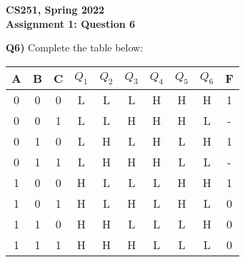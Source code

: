 \documentclass[12pt]{article}
\begin{document}
\begin{center}
{\Large\textbf{CS251, Spring 2022}}\\
\vspace{2mm}
{\Large\textbf{Assignment 1: Question 6}}\\
\vspace{3mm}
\end{center}
\textbf{Q6)} Complete the table below: \\

\begin{adjustwidth}{0em}{0pt}
\begin{center}
\begin{tabular}{|| c c c | c c c c c c| c ||} 
 \hline
 A & B & C & $Q_1$ & $Q_2$ & $Q_3$ & $Q_4$ & $Q_5$ & $Q_6$ & F \\ [0.5ex] 
 \hline\hline
 0 & 0 & 0 & L & L & L & H & H & H & 1\\ 
 \hline
 0 & 0 & 1 & L & L & H & H & H & L & -\\ 
 \hline
 0 & 1 & 0 & L & H & L & H & L & H & 1\\ 
 \hline
 0 & 1 & 1 & L & H & H & H & L & L & -\\ 
 \hline
 1 & 0 & 0 & H & L & L & L & H & H & 1\\ 
 \hline
 1 & 0 & 1 & H & L & H & L & H & L & 0\\ 
 \hline
 1 & 1 & 0 & H & H & L & L & L & H & 0\\ 
 \hline
 1 & 1 & 1 & H & H & H & L & L & L & 0\\  [1ex] 
 \hline
\end{tabular}
\end{center}
\end{adjustwidth}
\end{document}
